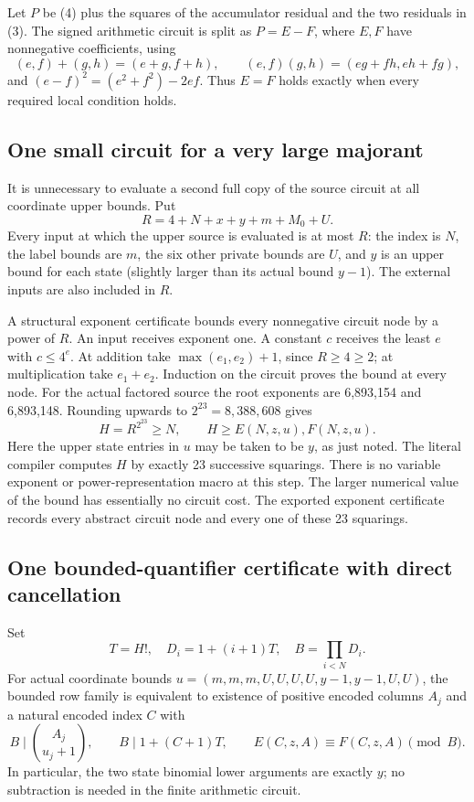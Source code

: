 \documentclass[11pt]{article}
\begin{document}
Let $P$ be (4) plus the squares of the accumulator residual and the two
residuals in (3).  The signed arithmetic circuit is split as $P=E-F$,
where $E,F$ have nonnegative coefficients, using
\[
 (e,f)+(g,h)=(e+g,f+h),\qquad
 (e,f)(g,h)=(eg+fh,eh+fg),
\]
and $(e-f)^2=(e^2+f^2)-2ef$.  Thus $E=F$ holds exactly when every
required local condition holds.

\subsection{One small circuit for a very large majorant}

It is unnecessary to evaluate a second full copy of the source circuit at
all coordinate upper bounds.  Put
\[
 R=4+N+x+y+m+M_0+U.
\]
Every input at which the upper source is evaluated is at most $R$: the
index is $N$, the label bounds are $m$, the six other private bounds are
$U$, and $y$ is an upper bound for each state (slightly larger than its
actual bound $y-1$).  The external inputs are also included in $R$.

A structural exponent certificate bounds every nonnegative circuit node
by a power of $R$.  An input receives exponent one.  A constant $c$
receives the least $e$ with $c\le4^e$.  At addition take
$\max(e_1,e_2)+1$, since $R\ge4\ge2$; at multiplication take $e_1+e_2$.
Induction on the circuit proves the bound at every node.  For the actual
factored source the root exponents are 6,893,154 and 6,893,148.
Rounding upwards to $2^{23}=8,388,608$ gives
\[
 H=R^{2^{23}}\ge N,\qquad H\ge E(N,z,u),F(N,z,u). \tag{5}
\]
Here the upper state entries in $u$ may be taken to be $y$, as just noted.
The literal compiler computes $H$ by exactly 23 successive squarings.
There is no variable exponent or power-representation macro at this step.
The larger numerical value of the bound has essentially no circuit cost.
The exported exponent certificate records every abstract circuit node
and every one of these 23 squarings.

\subsection{One bounded-quantifier certificate with direct cancellation}

Set
\[
 T=H!,\quad D_i=1+(i+1)T,\quad B=\prod_{i<N}D_i.
\]
For actual coordinate bounds
$u=(m,m,m,U,U,U,U,y-1,y-1,U,U)$, the bounded row family is equivalent to
existence of positive encoded columns $A_j$ and a natural encoded index $C$
with
\[
 B\mid {A_j\choose u_j+1},\qquad
 B\mid1+(C+1)T,\qquad E(C,z,A)\equiv F(C,z,A)\pmod B. \tag{6}
\]
In particular, the two state binomial lower arguments are exactly $y$;
no subtraction is needed in the finite arithmetic circuit.
\end{document}

